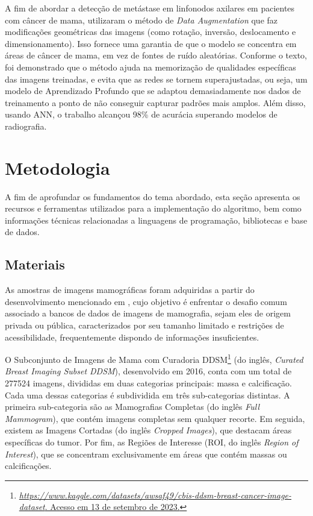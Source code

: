 A fim de abordar a detecção de metástase em linfonodos axilares em pacientes com câncer de mama,  utilizaram o método de \textit{Data Augmentation} que faz modificações geométricas das imagens (como rotação, inversão, deslocamento e dimensionamento). Isso fornece uma garantia de que o modelo se concentra em áreas de câncer de mama, em vez de fontes de ruído aleatórias. Conforme o texto, foi demonstrado que o método ajuda na memorização de qualidades específicas das imagens treinadas, e evita que as redes se tornem superajustadas, ou seja, um modelo de Aprendizado Profundo que se adaptou demasiadamente nos dados de treinamento a ponto de não conseguir capturar padrões mais amplos. Além disso, usando ANN, o trabalho alcançou 98\% de acurácia superando modelos de radiografia.




\section{\esp Metodologia} \label{metodologia}
A fim de aprofundar os fundamentos do tema abordado, esta seção apresenta os recursos e ferramentas utilizados para a implementação do algoritmo, bem como informações técnicas relacionadas a linguagens de programação, bibliotecas e base de dados.



\subsection{\esp Materiais} \label{materiais}

As amostras de imagens mamográficas foram adquiridas a partir do desenvolvimento mencionado em , cujo objetivo é enfrentar o desafio comum associado a bancos de dados de imagens de mamografia, sejam eles de origem privada ou pública, caracterizados por seu tamanho limitado e restrições de acessibilidade, frequentemente dispondo de informações insuficientes.

O Subconjunto de Imagens de Mama com Curadoria DDSM\footnote{\href{https://www.kaggle.com/datasets/awsaf49/cbis-ddsm-breast-cancer-image-dataset}{\textit{https://www.kaggle.com/datasets/awsaf49/cbis-ddsm-breast-cancer-image-dataset}. Acesso em 13 de setembro de 2023.}} (do inglês, \textit{Curated Breast Imaging Subset DDSM}), desenvolvido em 2016, conta com um total de 277524 imagens, divididas em duas categorias principais: massa e calcificação. Cada uma dessas categorias é subdividida em três sub-categorias distintas. A primeira sub-categoria são as Mamografias Completas (do inglês \textit{Full Mammogram}), que contém imagens completas sem qualquer recorte. Em seguida, existem as Imagens Cortadas (do inglês \textit{Cropped Images}), que destacam áreas específicas do tumor. Por fim, as Regiões de Interesse (ROI, do inglês \textit{Region of Interest}), que se concentram exclusivamente em áreas que contém massas ou calcificações. 

